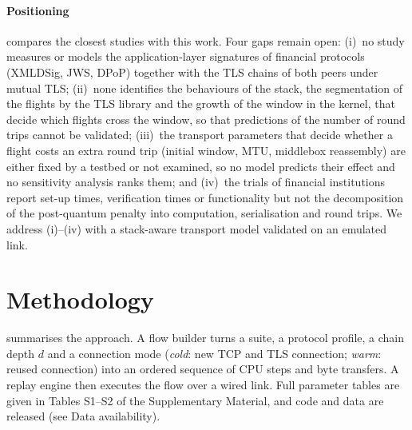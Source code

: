\documentclass[preprint,12pt]{elsarticle}
\newcommand{\supp}[1]{#1 of the Supplementary Material}
\begin{document}
\paragraph{Positioning}  compares the closest studies with this work. Four gaps remain open: (i)~no study measures or models the application-layer signatures of financial protocols (XMLDSig, JWS, DPoP) together with the TLS chains of both peers under mutual TLS; (ii)~none identifies the behaviours of the stack, the segmentation of the flights by the TLS library and the growth of the window in the kernel, that decide which flights cross the window, so that predictions of the number of round trips cannot be validated; (iii)~the transport parameters that decide whether a flight costs an extra round trip (initial window, MTU, middlebox reassembly) are either fixed by a testbed or not examined, so no model predicts their effect and no sensitivity analysis ranks them; and (iv)~the trials of financial institutions report set-up times, verification times or functionality but not the decomposition of the post-quantum penalty into computation, serialisation and round trips. We address (i)--(iv) with a stack-aware transport model validated on an emulated link.





\section{Methodology}
\label{sec:method}

 summarises the approach. A flow builder turns a suite, a protocol profile, a chain depth $d$ and a connection mode (\emph{cold}: new TCP and TLS connection; \emph{warm}: reused connection) into an ordered sequence of CPU steps and byte transfers. A replay engine then executes the flow over a wired link. Full parameter tables are given in \supp{Tables S1--S2}, and code and data are released (see Data availability).
\end{document}
